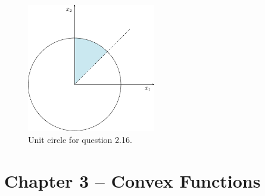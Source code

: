 \documentclass[11pt,a4paper]{article}
\begin{document}
\begin{itemize}
\begin{itemize}
        \begin{figure}[!htb]
            \centering
            \includegraphics[width=0.5\textwidth]{figures/circle216.pdf}
            \caption{Unit circle for question 2.16.}\label{fig:circle-216}
        \end{figure}
        
    \end{itemize}
\end{itemize}

\section*{Chapter 3 -- Convex Functions}
\end{document}

